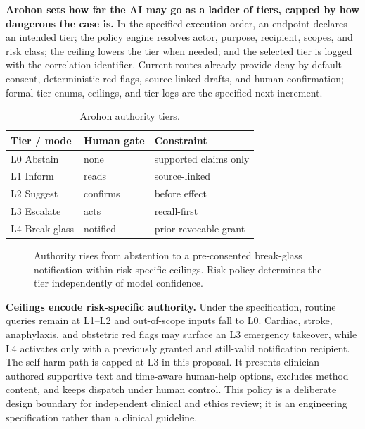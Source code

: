 \documentclass[12pt,twocolumn,a4paper]{article}
\begin{document}
\textbf{Arohon sets how far the AI may go as a ladder of tiers, capped by how dangerous the
case is.} In the specified execution order, an endpoint declares an intended tier; the policy engine resolves
actor, purpose, recipient, scopes, and risk class; the ceiling lowers the tier when needed;
and the selected tier is logged with the correlation identifier. Current routes already
provide deny-by-default consent, deterministic red flags, source-linked drafts, and human
confirmation; formal tier enums, ceilings, and tier logs are the specified next increment.

\begin{table}[!t]
\caption{Arohon authority tiers.}
\label{tab:tiers}
\centering
\small
\setlength{\tabcolsep}{3pt}
\begin{tabularx}{\columnwidth}{@{}>{\raggedright\arraybackslash}p{2.35cm}>{\raggedright\arraybackslash}p{1.45cm}Y@{}}
\toprule
Tier / mode & Human gate & Constraint \\
\midrule
L0 Abstain & none & supported claims only \\
L1 Inform & reads & source-linked \\
L2 Suggest & confirms & before effect \\
L3 Escalate & acts & recall-first \\
L4 Break glass & notified & prior revocable grant \\
\bottomrule
\end{tabularx}
\end{table}

\begin{figure}[!t]
\centering
\resizebox{\columnwidth}{!}{}
\caption{Authority rises from abstention to a pre-consented break-glass notification within
risk-specific ceilings. Risk policy determines the tier independently of model confidence.}
\label{fig:arohon}
\end{figure}

\textbf{Ceilings encode risk-specific authority.} Under the specification, routine queries
remain at L1--L2 and out-of-scope inputs fall to L0. Cardiac, stroke, anaphylaxis, and
obstetric red flags may surface an L3 emergency takeover, while L4 activates only with a
previously granted and still-valid notification recipient. The self-harm path is capped at
L3 in this proposal. It presents clinician-authored supportive text and time-aware
human-help options, excludes method content, and keeps dispatch under human control. This policy is a deliberate design
boundary for independent clinical and ethics review; it is an engineering specification
rather than a clinical guideline.
\end{document}
